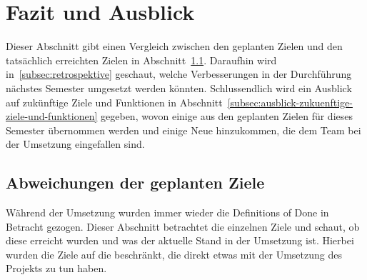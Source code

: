 \section{Fazit und Ausblick}\label{sec:fazit-ausblick}

Dieser Abschnitt gibt einen Vergleich zwischen den geplanten Zielen und den tatsächlich erreichten Zielen in Abschnitt~\ref{subsec:abweichungen-der-geplanten-ziele}.
Daraufhin wird in~\ref{subsec:retrospektive} geschaut, welche Verbesserungen in der Durchführung nächstes Semester umgesetzt werden könnten.
Schlussendlich wird ein Ausblick auf zukünftige Ziele und Funktionen in Abschnitt~\ref{subsec:ausblick-zukuenftige-ziele-und-funktionen} gegeben, wovon einige aus den geplanten Zielen für dieses Semester übernommen werden und einige Neue hinzukommen, die dem Team bei der Umsetzung eingefallen sind.

\subsection{Abweichungen der geplanten Ziele}\label{subsec:abweichungen-der-geplanten-ziele}
Während der Umsetzung wurden immer wieder die Definitions of Done in Betracht gezogen.
Dieser Abschnitt betrachtet die einzelnen Ziele und schaut, ob diese erreicht wurden und was der aktuelle Stand in der Umsetzung ist.
Hierbei wurden die Ziele auf die beschränkt, die direkt etwas mit der Umsetzung des Projekts zu tun haben.

